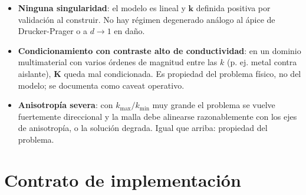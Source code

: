 \documentclass[11pt,letterpaper,oneside]{report}
\begin{document}
\begin{itemize}
  \item \textbf{Ninguna singularidad}: el modelo es lineal y $\mathbf k$ definida positiva por validación al construir. No hay régimen degenerado análogo al ápice de Drucker-Prager o a $d \to 1$ en daño.
  \item \textbf{Condicionamiento con contraste alto de conductividad}: en un dominio multimaterial con varios órdenes de magnitud entre las $k$ (p. ej. metal contra aislante), $\mathbf K$ queda mal condicionada. Es propiedad del problema físico, no del modelo; se documenta como caveat operativo.
  \item \textbf{Anisotropía severa}: con $k_{\max}/k_{\min}$ muy grande el problema se vuelve fuertemente direccional y la malla debe alinearse razonablemente con los ejes de anisotropía, o la solución degrada. Igual que arriba: propiedad del problema.
\end{itemize}


\section{Contrato de implementación}
\end{document}
